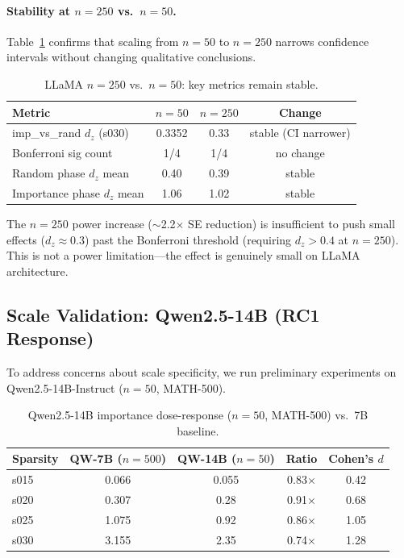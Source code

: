 \documentclass[11pt,a4paper]{article}
\begin{document}
\paragraph{Stability at $n=250$ vs.\ $n=50$.} Table~\ref{tab:llama_stability} confirms that scaling from $n=50$ to $n=250$ narrows confidence intervals without changing qualitative conclusions.

\begin{table}[h]
\centering
\caption{LLaMA $n=250$ vs.\ $n=50$: key metrics remain stable.}
\label{tab:llama_stability}
\begin{tabular}{lccc}
\toprule
\textbf{Metric} & \textbf{$n=50$} & \textbf{$n=250$} & \textbf{Change} \\
\midrule
imp\_vs\_rand $d_z$ (s030) & 0.3352 & 0.33 & stable (CI narrower) \\
Bonferroni sig count & 1/4 & 1/4 & no change \\
Random phase $d_z$ mean & 0.40 & 0.39 & stable \\
Importance phase $d_z$ mean & 1.06 & 1.02 & stable \\
\bottomrule
\end{tabular}
\end{table}

The $n=250$ power increase ($\sim$2.2$\times$ SE reduction) is insufficient to push small effects ($d_z \approx 0.3$) past the Bonferroni threshold (requiring $d_z > 0.4$ at $n=250$). This is not a power limitation---the effect is genuinely small on LLaMA architecture.

\subsection{Scale Validation: Qwen2.5-14B (RC1 Response)}
\label{sec:14b}

To address concerns about scale specificity, we run preliminary experiments on Qwen2.5-14B-Instruct ($n=50$, MATH-500).

\begin{table}[h]
\centering
\caption{Qwen2.5-14B importance dose-response ($n=50$, MATH-500) vs.\ 7B baseline.}
\label{tab:14b}
\begin{tabular}{lcccc}
\toprule
\textbf{Sparsity} & \textbf{QW-7B} ($n=500$) & \textbf{QW-14B} ($n=50$) & \textbf{Ratio} & \textbf{Cohen's $d$} \\
\midrule
s015 & 0.066 & 0.055 & 0.83$\times$ & 0.42 \\
s020 & 0.307 & 0.28 & 0.91$\times$ & 0.68 \\
s025 & 1.075 & 0.92 & 0.86$\times$ & 1.05 \\
s030 & 3.155 & 2.35 & 0.74$\times$ & 1.28 \\
\bottomrule
\end{tabular}
\end{table}
\end{document}
